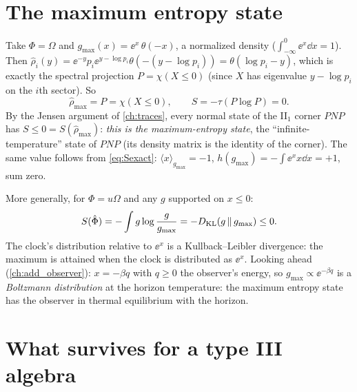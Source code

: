 \section{The maximum entropy state}

Take $\Phi=\Omega$ and $g_{\max}(x)=\ee^{x}\,\theta(-x)$, a normalized density ($\int_{-\infty}^0\ee^x\dd x=1$). Then $\hat\rho_i(y)=\ee^{-y}p_i\ee^{y-\log p_i}\theta(-(y-\log p_i))=\theta(\log p_i-y)$, which is exactly the spectral projection $P=\chi(X\le0)$ (since $X$ has eigenvalue $y-\log p_i$ on the $i$th sector). So
\begin{equation}
\hat\rho_{\max}=P=\chi(X\le0),\qquad S=-\tau(P\log P)=0.
\end{equation}
By the Jensen argument of \cref{ch:traces}, every normal state of the II$_1$ corner $PNP$ has $S\le0=S(\hat\rho_{\max})$: \emph{this is the maximum-entropy state}, the ``infinite-temperature'' state of $PNP$ (its density matrix is the identity of the corner). The same value follows from \eqref{eq:Sexact}: $\langle x\rangle_{g_{\max}}=-1$, $h(g_{\max})=-\int\ee^xx\dd x=+1$, sum zero.

More generally, for $\Phi=u\Omega$ and any $g$ supported on $x\le0$:
\begin{equation}
S(\hat\Phi)=-\int g\log\frac{g}{g_{\max}}=-D_{\rm KL}(g\,\|\,g_{\max})\le0.
\end{equation}
The clock's distribution relative to $\ee^{x}$ is a Kullback--Leibler divergence: the maximum is attained when the clock is distributed as $\ee^{x}$. Looking ahead (\cref{ch:add_observer}): $x=-\beta q$ with $q\ge0$ the observer's energy, so $g_{\max}\propto\ee^{-\beta q}$ is a \emph{Boltzmann distribution} at the horizon temperature: the maximum entropy state has the observer in thermal equilibrium with the horizon.

\section{What survives for a type III algebra}

